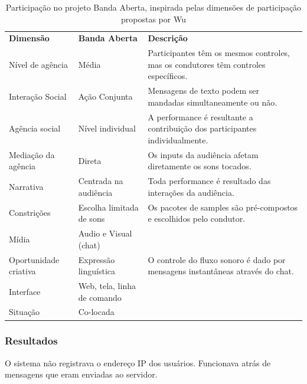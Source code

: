 \begin{table}
\ABNTEXfontereduzida
\setlength\extrarowheight{-2pt}
\caption{Participação no projeto Banda Aberta, inspirada pelas dimensões de participação propostas por Wu \cite{wu2017open}}{%
\begin{tabular}{p{3cm}p{3cm}p{6cm}}
\hline
\textbf{Dimensão } & \textbf{Banda Aberta} & \textbf{Descrição} \\
Nível de agência & Média & Participantes têm os mesmos controles, mas os condutores têm controles específicos.\\
Interação Social & Ação Conjunta & Mensagens de texto podem ser mandadas simultaneamente ou não.\\
Agência social  & Nível individual & A performance é resultante a contribuição dos participantes individualmente.\\
Mediação da agência & Direta & Os inputs da audiência afetam diretamente os sons tocados. \\
Narrativa & Centrada na audiência & Toda performance é resultado das interações da audiência.\\
Constrições & Escolha limitada de sons & Os pacotes de samples são pré-compostos e escolhidos pelo condutor.\\
Mídia & Audio e Visual (chat) & \\
Oportunidade criativa & Expressão linguística & O controle do fluxo sonoro é dado por mensagens instantâneas através do chat.\\
Interface & Web, tela, linha de comando & \\
Situação & Co-locada & \\
\hline
\end{tabular}}
\label{tab:participation}
\end{table}

\newpage

\subsubsection{Resultados}

O sistema não registrava o endereço IP dos usuários. Funcionava atrás de mensagens que eram enviadas ao servidor. %




